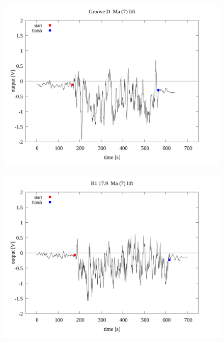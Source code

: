 \documentclass[a4paper]{jsarticle}
\begin{document}
\begin{figure}[htbp]
    \footnotesize
    \begin{center}
        \includegraphics[width=140mm]{../../../../33_result/210806/moving_average/7/lift/02/Groove_D_ma(7)_lift_02.png}
    \end{center}
\end{figure}

\begin{figure}[htbp]
    \footnotesize
    \begin{center}
        \includegraphics[width=140mm]{../../../../33_result/210806/moving_average/7/lift/02/R1_17.9_ma(7)_lift_02.png}
    \end{center}
\end{figure}
\end{document}
